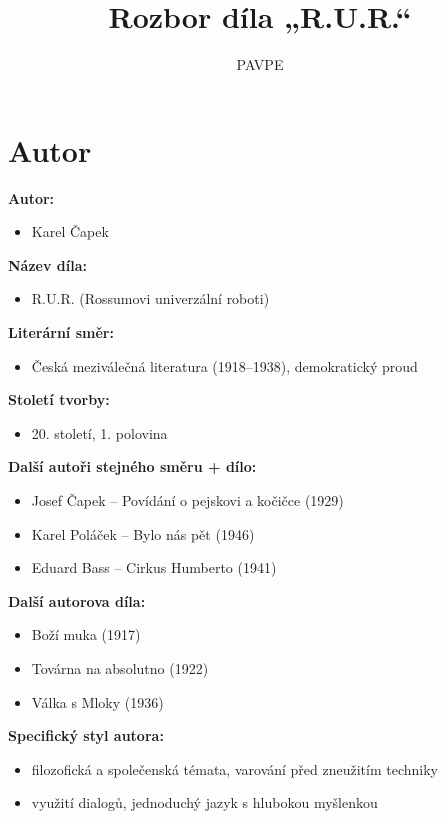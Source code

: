 \documentclass[12pt,a4paper]{article}
\title{\textbf{Rozbor díla „R.U.R.“}}
\author{PAVPE}
\date{}
\begin{document}
\maketitle

\section*{Autor}

\begin{tcolorbox}[breakable]

\textbf{Autor:}
\begin{itemize}
\item Karel Čapek
\end{itemize}

\textbf{Název díla:}
\begin{itemize}
\item R.U.R. (Rossumovi univerzální roboti)
\end{itemize}

\textbf{Literární směr:}
\begin{itemize}
\item Česká meziválečná literatura (1918–1938), demokratický proud
\end{itemize}

\textbf{Století tvorby:}
\begin{itemize}
\item 20. století, 1. polovina
\end{itemize}

\textbf{Další autoři stejného směru + dílo:}
\begin{itemize}
\item Josef Čapek – Povídání o pejskovi a kočičce (1929)
\item Karel Poláček – Bylo nás pět (1946)
\item Eduard Bass – Cirkus Humberto (1941)
\end{itemize}

\textbf{Další autorova díla:}
\begin{itemize}
\item Boží muka (1917)
\item Továrna na absolutno (1922)
\item Válka s Mloky (1936)
\end{itemize}

\textbf{Specifický styl autora:}
\begin{itemize}
\item filozofická a společenská témata, varování před zneužitím techniky
\item využití dialogů, jednoduchý jazyk s hlubokou myšlenkou
\end{itemize}

\end{tcolorbox}
\end{document}
